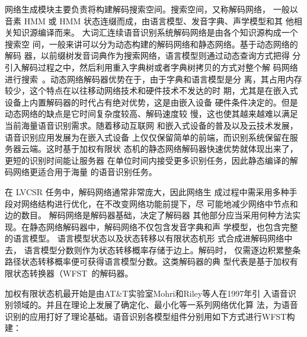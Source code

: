 网络生成模块主要负责将构建解码搜索空间。搜索空间，又称解码网络， 一般以音素 HMM 或 HMM 状态连缀而成，由语言模型、发音字典、声学模型和其
他相关知识源编译而来。
大词汇连续语音识别系统解码网络是由各个知识源构成一个搜索空
间，一般来讲可以分为动态构建的解码网络和静态网络。基于动态网络的解码
器，以前缀树发音词典作为搜索网络，语言模型则通过动态查询方式把得
分引入解码过程之中，然后利用重入字典树或者字典树拷贝的方式对整个解
码网络进行搜索~\cite{young2002htk}。动态网络解码器优势在于，由于字典和语言模型是分
离，其占用内存较少，这个特点在以往移动网络技术和硬件技术不发达的时
期，尤其是在嵌入式设备上内置解码器的时代占有绝对优势，这是由嵌入设备
硬件条件决定的。但是动态网络的缺点是它时间复杂度较高、解码速度较
慢，这也使其越来越难以满足当前海量语音识别需求。随着移动互联网
和嵌入式设备的普及以及云技术发展，语音识别应用发展为在嵌入式设备
上仅仅保留简单的前端，而识别系统保留在服务器云端。这时基于加权有限状
态机的静态网络解码器快速优势就体现出来了，更短的识别时间能让服务器
在单位时间内接受更多识别任务，因此静态编译的解码网络更适合用于海量
的语音识别任务。

在 LVCSR 任务中，解码网络通常非常庞大，因此网络生
成过程中需采用多种手段对网络结构进行优化，在不改变网络功能前提下，尽
可能地减少网络中节点和边的数目。 解码网络是解码器基础，决定了解码器
其他部分应当采用何种方法实现。在静态网络解码器中，解码网络不仅包含发音字典和声
学模型，也包含完整的语言模型。 语言模型状态以及状态转移以有限状态机形
式合成进解码网络中去， 语言模型分数则作为状态转移概率存储于边上。解码时，
仅需逐边积累整条路径状态转移概率便可获得语言模型分数。这类解码器的典
型代表是基于加权有限状态转换器（WFST~\cite{mohri2002weighted}的解码器。

加权有限状态机最开始是由AT\&T实验室Mohri和Riley等人在1997年引
入语音识别领域的。并且在理论上发展了确定化、最小化等一系列网络优化算
法，为语音识别的应用打好了理论基础。语音识别各模型组件分别用如下方式进行WFST构建：

